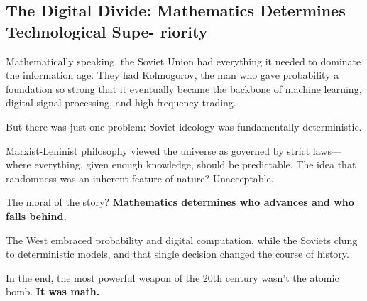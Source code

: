 \subsection{The Digital Divide: Mathematics Determines Technological Supe- riority}

Mathematically speaking, the Soviet Union had everything it needed to dominate the information age. They had Kolmogorov, the man who gave probability a foundation so strong that it eventually became the backbone of machine learning, digital signal processing, and high-frequency trading.

But there was just one problem: Soviet ideology was fundamentally deterministic.  

Marxist-Leninist philosophy viewed the universe as governed by strict laws—where everything, given enough knowledge, should be predictable. The idea that randomness was an inherent feature of nature? Unacceptable.

The moral of the story? \textbf{Mathematics determines who advances and who falls behind.}  

The West embraced probability and digital computation, while the Soviets clung to deterministic models, and that single decision changed the course of history.  

In the end, the most powerful weapon of the 20th century wasn’t the atomic bomb.  \textbf{It was math.}
